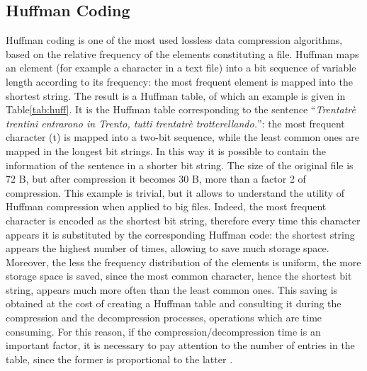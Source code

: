 \subsection{Huffman Coding}
\label{sec:huff}
Huffman coding is one of the most used lossless data compression algorithms, based on the relative frequency of the elements constituting a file. Huffman maps an element (for example a character in a text file) into a bit sequence of variable length according to its frequency: the most frequent element is mapped into the shortest string. The result is a Huffman table, of which an example is given in Table\ref{tab:huff}. It is the Huffman table corresponding to the sentence ``\textit{Trentatrè trentini entrarono in Trento, tutti trentatrè trotterellando.}'': the most frequent character (t) is mapped into a two-bit sequence, while the least common ones are mapped in the longest bit strings. In this way it is possible to contain the information of the sentence in a shorter bit string. The size of the original file is 72 B, but after compression it becomes 30 B, more than a factor 2 of compression. This example is trivial, but it allows to understand the utility of Huffman compression when applied to big files. Indeed, the most frequent character is encoded as the shortest bit string, therefore every time this character appears it is substituted by the corresponding Huffman code: the shortest string appears the highest number of times, allowing to save much storage space. Moreover, the less the frequency distribution of the elements is uniform, the more storage space is saved, since the most common character, hence the shortest bit string, appears much more often than the least common ones. This saving is obtained at the cost of creating a Huffman table and consulting it during the compression and the decompression processes, operations which are time consuming. For this reason, if the compression/decompression time is an important factor, it is necessary to pay attention to the number of entries in the table, since the former is proportional to the latter \cite{huffman}.
%
